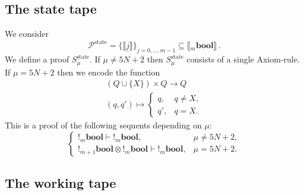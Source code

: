 \documentclass[english,letter paper,12pt,reqno]{article}
\theoremstyle{definition}
\newcommand{\lto}{\longrightarrow}
\begin{document}
\subsection{The state tape}

We consider
\begin{equation}
    \mathcal{P}^{\text{state}} = \{\llbracket \underline{j}\rrbracket\}_{j = 0, \ldots, m-1} \subseteq \llbracket {}_m\textbf{bool}\rrbracket\,.
\end{equation}
We define a proof $S^{\text{state}}_\mu$. If $\mu \neq 5N+2$ then $S^{\text{state}}_\mu$ consists of a single Axiom-rule. If $\mu = 5N+2$ then we encode the function
\begin{gather*}
    (Q \cup \{X\}) \times Q \lto Q\\
    (q,q') \longmapsto
    \begin{cases}
        q, & q \neq X,\\
        q', & q = X.
    \end{cases}
\end{gather*}
This is a proof of the following sequents depending on $\mu$:
\begin{equation}
    \begin{cases}
        {!}{}_{m}\textbf{bool} \vdash {!}{}_{m}\textbf{bool},& \mu \neq 5N+2,\\
        {!}{}_{m+1}\textbf{bool} \otimes {!}{}_{m}\textbf{bool} \vdash {!}{}_{m}\textbf{bool},& \mu = 5N+2.
    \end{cases}
\end{equation}

\subsection{The working tape}
\end{document}
